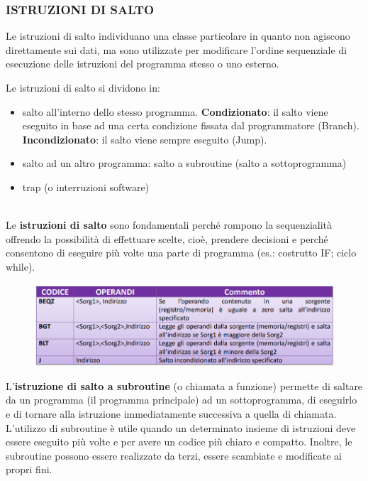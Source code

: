 \documentclass[12pt]{article} %
\begin{document}
\subsubsection{ISTRUZIONI DI SALTO}
Le istruzioni di salto individuano una classe particolare in quanto non agiscono direttamente sui dati, ma sono utilizzate per modificare l’ordine sequenziale di esecuzione delle istruzioni del programma stesso o uno esterno. \par\medskip\noindent
Le istruzioni di salto si dividono in:
\begin{itemize}
    \item salto all’interno dello stesso programma.\textbf{ Condizionato}: il salto viene eseguito in base ad una certa condizione fissata dal programmatore (Branch).\textbf{ Incondizionato}: il salto viene sempre eseguito (Jump).
    \item salto ad un altro programma: salto a subroutine (salto a sottoprogramma) 
    \item trap (o interruzioni software)
\end{itemize}
\par\maketitle\noindent \\ 
Le \textbf{istruzioni di salto} sono fondamentali perché rompono la sequenzialità offrendo la possibilità di effettuare scelte, cioè, prendere decisioni e perché consentono di eseguire più volte una parte di programma (es.: costrutto IF; ciclo while).
\begin{figure}[h]
    \centering
    \includegraphics[width=1\linewidth]{salto.png}
\end{figure}
\newpage
\noindent L’\textbf{istruzione di salto a subroutine} (o chiamata a funzione) permette di saltare da un programma (il programma principale) ad un sottoprogramma, di eseguirlo e di tornare alla istruzione immediatamente successiva a quella di chiamata. L’utilizzo di subroutine è utile quando un determinato insieme di istruzioni deve essere eseguito più volte e per avere un codice più chiaro e compatto. Inoltre, le subroutine possono essere realizzate da terzi, essere scambiate e modificate ai propri fini.
\end{document}
